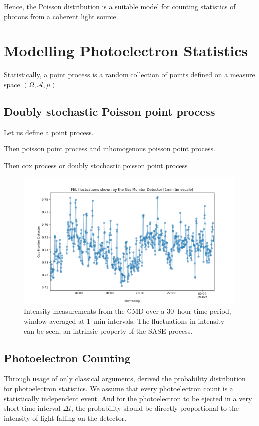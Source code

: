 Hence, the Poisson distribution is a suitable model for counting statistics of photons from a coherent light source.

\section{Modelling Photoelectron Statistics}\label{section:photoelectron-counting-stats}
Statistically, a point process is a random collection of points defined on a measure space $(\Omega, \mathcal{A}, \mu)$

\subsection{Doubly stochastic Poisson point process}
Let us define a point process. 

Then poisson point process and inhomogenous poisson point process.

Then cox process or doubly stochastic poisson point process

\begin{figure}
    \centering
    \includegraphics[width=0.7\linewidth]{images/2024-08-16-13-56-32.png}
    \caption{Intensity measurements from the \gls{GMD} over a \qty{30}{hour} time period, window-averaged at \qty{1}{min} intervals. The fluctuations in intensity can be seen, an intrinsic property of the \gls{SASE} process.}
    \label{fig:gmd-intensity}
\end{figure}

\subsection{Photoelectron Counting}
Through usage of only classical arguments, \citeauthor{mandelFluctuationsPhotonBeams1958} \cite{mandelFluctuationsPhotonBeams1958,mandelFluctuationsPhotonBeams1959} derived the probability distribution for photoelectron statistics. We assume that every photoelectron count is a statistically independent event. And for the photoelectron to be ejected in a very short time interval $\Delta t$, the probability should be directly proportional to the intensity of light falling on the detector.

